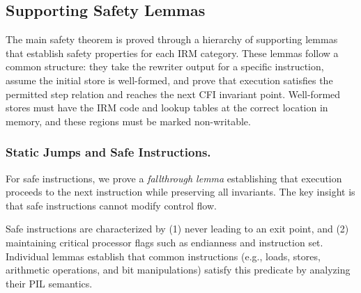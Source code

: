 


\subsection{Supporting Safety Lemmas}

The main safety theorem is proved through a hierarchy of supporting lemmas that establish safety properties for each IRM category.
These lemmas follow a common structure: they take the rewriter output for a specific instruction, assume the initial store is well-formed, and prove that execution satisfies the permitted step relation and reaches the next CFI invariant point.
Well-formed stores must have the IRM code and lookup tables at the correct location in memory, and these regions must be marked non-writable.

\subsubsection{Static Jumps and Safe Instructions.}

For safe instructions, we prove a \emph{fallthrough lemma} establishing that execution proceeds to the next instruction while preserving all invariants.
The key insight is that safe instructions cannot modify control flow.

Safe instructions are characterized by (1) never leading to an exit point, and (2) maintaining critical processor flags such as endianness and instruction set.
Individual lemmas establish that common instructions (e.g., loads, stores, arithmetic operations, and bit manipulations) satisfy this predicate by analyzing their PIL semantics.

